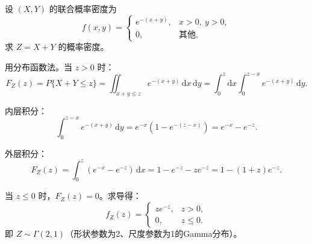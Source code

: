﻿\documentclass[lang=cn,11pt]{elegantbook}
\begin{document}
\begin{exercise}\label{exer:3-8}
设 $(X,Y)$ 的联合概率密度为
\[
f(x,y) = \begin{cases} e^{-(x+y)}, & x > 0,\ y > 0, \\ 0, & \text{其他}, \end{cases}
\]
求 $Z = X + Y$ 的概率密度。
\end{exercise}

\begin{solution}
用分布函数法。当 $z > 0$ 时：
\[
F_Z(z) = P\{X+Y \leqslant z\} = \iint_{x+y \leqslant z}e^{-(x+y)}\,\mathrm{d}x\,\mathrm{d}y = \int_0^z\mathrm{d}x\int_0^{z-x}e^{-(x+y)}\,\mathrm{d}y.
\]

内层积分：
\[
\int_0^{z-x}e^{-(x+y)}\,\mathrm{d}y = e^{-x}(1-e^{-(z-x)}) = e^{-x} - e^{-z}.
\]

外层积分：
\[
F_Z(z) = \int_0^z(e^{-x} - e^{-z})\,\mathrm{d}x = 1 - e^{-z} - ze^{-z} = 1 - (1+z)e^{-z}.
\]

当 $z \leqslant 0$ 时，$F_Z(z) = 0$。求导得：
\[
f_Z(z) = \begin{cases} ze^{-z}, & z > 0, \\ 0, & z \leqslant 0. \end{cases}
\]
即 $Z \sim \Gamma(2, 1)$（形状参数为2、尺度参数为1的Gamma分布）。
\end{solution}
\end{document}
